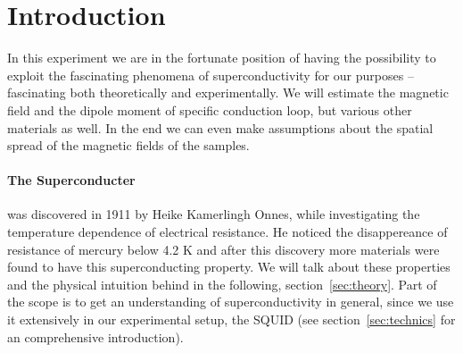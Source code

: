 \section{Introduction}
In this experiment we are in the fortunate position of having the 
possibility to exploit the fascinating phenomena of superconductivity for
our purposes -- fascinating both theoretically and experimentally. We will
estimate the magnetic field and the dipole moment of specific conduction loop,
but various other materials as well. In the end we can even make assumptions
about the spatial spread of the magnetic fields of the samples.
\paragraph{The Superconducter} 
was discovered in 1911 by Heike Kamerlingh Onnes, while
investigating the temperature dependence of electrical resistance.
He noticed the disappereance of resistance of mercury below 4.2 K and
after this discovery more materials were found to have this
superconducting property. We will talk about these properties and the
physical intuition behind in the following, section~\ref{sec:theory}.
Part of the scope is 
to get an understanding of superconductivity in general, since we use it
extensively in our experimental setup, the SQUID 
(see section~\ref{sec:technics} for an comprehensive introduction).


